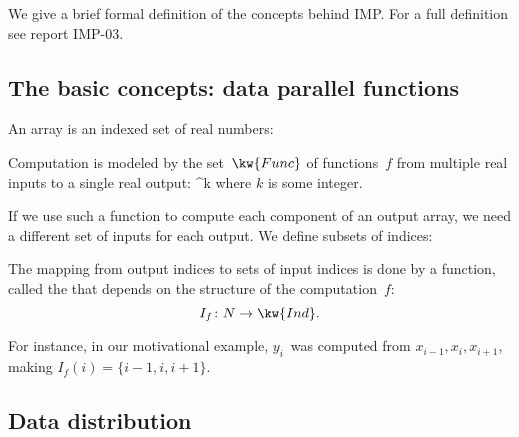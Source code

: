 We give a brief formal definition of the concepts
behind \ac{IMP}. For a full definition see report IMP-03.

\subsection{The basic concepts: data parallel functions}
\label{sec:parallel-function}

An array is an indexed set of real numbers:
%

Computation is modeled by the set~$\kw{Func}$ of functions~$f$ from multiple
real inputs to a single real output:
%
  { \equiv  {}^k\rightarrow {}}
where $k$ is some integer.

If we use such a function to compute each component of an output array,
we need a different set of inputs for each output. We define
subsets of indices:
%

The mapping from output indices to sets of input indices is done
by a function, called the  that depends on the
structure of the computation~$f$:
%
\[ I_f\colon N\rightarrow \kw{Ind}. \]

For instance, in our motivational example, $y_i$~was computed
from $x_{i-1},x_i,x_{i+1}$, making $I_f(i)=\{i-1,i,i+1\}$.


\subsection{Data distribution}

